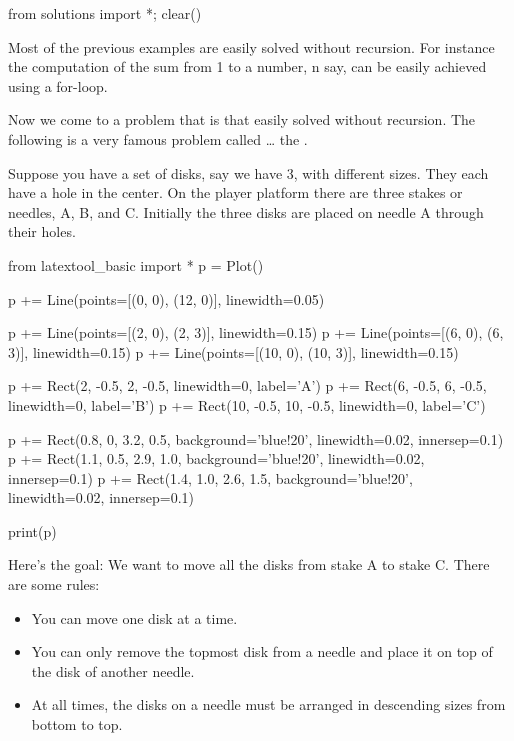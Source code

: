 \begin{python0}
from solutions import *; clear()
\end{python0}

Most of the previous examples are easily solved without recursion. For
instance the computation of the sum from 1 to a number, n say, can be
easily achieved using a for-loop.

Now we come to a problem that is  that easily solved
without recursion. The following is a very famous problem called
\ldots{} the .

Suppose you have a set of disks, say we have 3, with different sizes.
They each have a hole in the center. On the player platform there are
three stakes or needles, A, B, and C. Initially the three disks are
placed on needle A through their holes.

\begin{python}
from latextool_basic import *
p = Plot()

p += Line(points=[(0, 0), (12, 0)], linewidth=0.05)

p += Line(points=[(2, 0), (2, 3)], linewidth=0.15)
p += Line(points=[(6, 0), (6, 3)], linewidth=0.15)
p += Line(points=[(10, 0), (10, 3)], linewidth=0.15)

p += Rect(2, -0.5, 2, -0.5, linewidth=0, label='A')
p += Rect(6, -0.5, 6, -0.5, linewidth=0, label='B')
p += Rect(10, -0.5, 10, -0.5, linewidth=0, label='C')

p += Rect(0.8, 0, 3.2, 0.5, background='blue!20', linewidth=0.02, innersep=0.1)  
p += Rect(1.1, 0.5, 2.9, 1.0, background='blue!20', linewidth=0.02, innersep=0.1)
p += Rect(1.4, 1.0, 2.6, 1.5, background='blue!20', linewidth=0.02, innersep=0.1)

print(p)
\end{python}

 Here's the goal: We want to move all the disks from
 stake A to stake C. There are some rules:

 \begin{itemize}
 \item You can move one disk at a time.
 \item You can only remove the topmost disk from a needle and place it on top
   of the disk of another needle.
 \item At all times, the disks on a needle must be arranged in descending
   sizes from bottom to top.
 \end{itemize}

